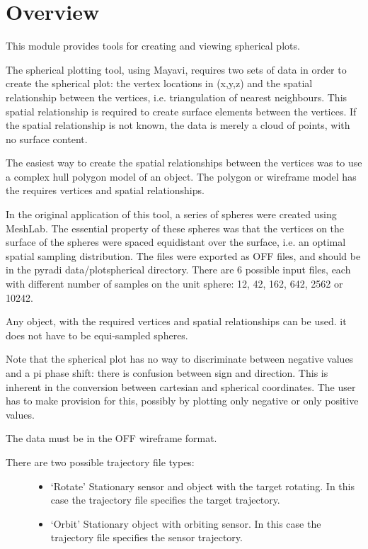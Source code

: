 \documentclass[a4paper,10pt,english]{sphinxmanual}
\begin{document}
\section{Overview}
\label{ryplotspherical:overview}\label{ryplotspherical:module-pyradi.ryplotspherical}
This module provides tools for creating and viewing spherical plots.

The spherical plotting tool, using Mayavi, requires two sets of data
in order to create the spherical plot: the vertex locations in (x,y,z)
and the spatial relationship between the vertices, i.e. triangulation of
nearest neighbours.  This spatial relationship is required to create
surface elements between the vertices. If the spatial relationship
is not known, the data is merely a cloud of points, with no surface
content.

The easiest way to create the spatial relationships between the vertices
was to use a complex hull polygon model of an object.  The polygon or
wireframe model has the requires vertices and spatial relationships.

In the original application of this tool, a series of spheres were created
using MeshLab.  The essential property of these spheres was that the vertices
on the surface of the spheres were spaced equidistant over the surface, i.e.
an optimal spatial sampling distribution.  The files were exported as OFF
files, and should be in the pyradi data/plotspherical directory.
There are 6 possible input files, each with different number of samples
on the unit sphere:  12, 42, 162, 642, 2562 or 10242.

Any object, with the required vertices and spatial relationships can
be used. it does not have to be equi-sampled spheres.

Note that the spherical plot has no way to discriminate between negative
values and a pi phase shift: there is confusion between sign and
direction.  This is inherent in the conversion between cartesian
and spherical coordinates. The user has to make provision for this,
possibly by plotting only negative or only positive values.

The data must be in the OFF wireframe format.
\begin{description}
\item[{There are two possible trajectory file types:}] \leavevmode\begin{itemize}
\item {} 
`Rotate' Stationary sensor and object with the target rotating.
In this case the trajectory file specifies the target trajectory.

\item {} 
`Orbit' Stationary object with orbiting sensor.
In this case the trajectory file specifies the sensor trajectory.

\end{itemize}

\end{description}
\end{document}
